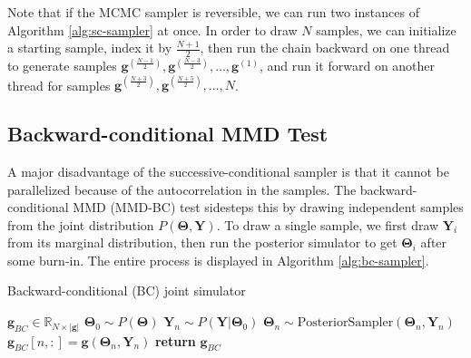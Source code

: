 \documentclass[a4paper,11pt]{article}
\begin{document}
Note that if the MCMC sampler is reversible, we can run two instances of Algorithm \ref{alg:sc-sampler} at once. In order to draw $N$ samples, we can initialize a starting sample, index it by $\frac{N+1}{2}$, then run the chain backward on one thread to generate samples $\mathbf{g}^{(\frac{N-1}{2})}, \mathbf{g}^{(\frac{N-3}{2})}, \ldots, \mathbf{g}^{(1)}$, and run it forward on another thread for samples $\mathbf{g}^{(\frac{N+3}{2})}, \mathbf{g}^{(\frac{N+5}{2})}, \ldots, N$.

\subsection{Backward-conditional MMD Test}
A major disadvantage of the successive-conditional sampler is that it cannot be parallelized because of the autocorrelation in the samples. The backward-conditional MMD (MMD-BC) test sidesteps this by drawing independent samples from the joint distribution $P(\mathbf{\Theta}, \mathbf{Y})$. To draw a single sample, we first draw $\mathbf{Y}_{i}$ from its marginal distribution, then run the posterior simulator to get $\mathbf{\Theta}_{i}$ after some burn-in. The entire process is displayed in Algorithm \ref{alg:bc-sampler}. 

\begin{algorithm}[H]
    \centering
    \caption{Backward-conditional (BC) joint simulator}\label{alg:bc-sampler}
    \begin{algorithmic}[1]
        \State {} $\mathbf{g}_{BC} \in \mathbb{R}_{N\times |\mathbf{g}|}$
            \State $\mathbf{\Theta}_{0} \sim P(\mathbf{\Theta})$ 
            \State $\mathbf{Y}_{n} \sim P(\mathbf{Y}|\mathbf{\Theta}_{0})$ 
                \State $\mathbf{\Theta}_{n} \sim \text{PosteriorSampler}(\mathbf{\Theta}_{n}, \mathbf{Y}_{n})$
            \EndFor
            \State $\mathbf{g}_{BC}[n, :] = \mathbf{g}(\mathbf{\Theta}_{n}, \mathbf{Y}_{n})$ 
        \EndFor        
        \State \textbf{return} $\mathbf{g}_{BC}$
    \end{algorithmic}
\end{algorithm}
\end{document}
